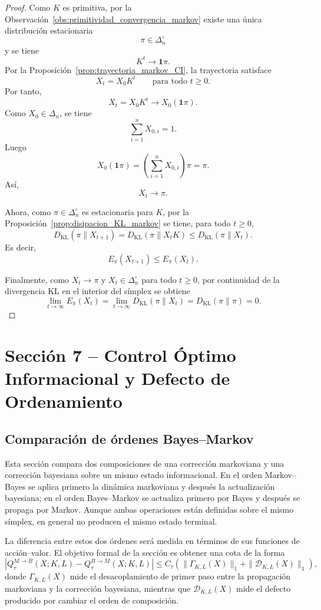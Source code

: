 \documentclass[12pt]{article}
\begin{document}
\begin{proof}
Como \(K\) es primitiva, por la Observación~\ref{obs:primitividad_convergencia_markov} existe una única distribución estacionaria
\[
\pi\in\Delta_n^\circ
\]
y se tiene
\[
K^t\longrightarrow \mathbf 1\pi.
\]
Por la Proposición~\ref{prop:trayectoria_markov_CI}, la trayectoria satisface
\[
X_t=X_0K^t
\qquad
\text{para todo }t\ge 0.
\]
Por tanto,
\[
X_t=X_0K^t\longrightarrow X_0(\mathbf 1\pi).
\]
Como \(X_0\in\Delta_n\), se tiene
\[
\sum_{i=1}^n X_{0,i}=1.
\]
Luego
\[
X_0(\mathbf 1\pi)
=
\left(\sum_{i=1}^n X_{0,i}\right)\pi
=
\pi.
\]
Así,
\[
X_t\longrightarrow \pi.
\]

Ahora, como \(\pi\in\Delta_n^\circ\) es estacionaria para \(K\), por la Proposición~\ref{prop:disipacion_KL_markov} se tiene, para todo \(t\ge 0\),
\[
D_{\mathrm{KL}}(\pi\|X_{t+1})
=
D_{\mathrm{KL}}(\pi\|X_tK)
\le
D_{\mathrm{KL}}(\pi\|X_t).
\]
Es decir,
\[
E_\pi(X_{t+1})\le E_\pi(X_t).
\]

Finalmente, como \(X_t\to\pi\) y \(X_t\in\Delta_n^\circ\) para todo \(t\ge 0\), por continuidad de la divergencia KL en el interior del símplex se obtiene
\[
\lim_{t\to\infty}E_\pi(X_t)
=
\lim_{t\to\infty}D_{\mathrm{KL}}(\pi\|X_t)
=
D_{\mathrm{KL}}(\pi\|\pi)
=
0.
\]
\end{proof}

\clearpage


\section{Sección 7 -- Control Óptimo Informacional y Defecto de Ordenamiento}

\subsection{Comparación de órdenes Bayes--Markov}

Esta sección compara dos composiciones de una corrección markoviana y una corrección bayesiana sobre un mismo estado informacional. En el orden Markov--Bayes se aplica primero la dinámica markoviana y después la actualización bayesiana; en el orden Bayes--Markov se actualiza primero por Bayes y después se propaga por Markov. Aunque ambas operaciones están definidas sobre el mismo símplex, en general no producen el mismo estado terminal.

La diferencia entre estos dos órdenes será medida en términos de sus funciones de acción--valor. El objetivo formal de la sección es obtener una cota de la forma
\[
\left|
Q_\tau^{M\to B}(X;K,L)-Q_\tau^{B\to M}(X;K,L)
\right|
\le
C_\tau\left(
\|\Gamma_{K,L}(X)\|_1+
\|\mathcal D_{K,L}(X)\|_1
\right),
\]
donde \(\Gamma_{K,L}(X)\) mide el desacoplamiento de primer paso entre la propagación markoviana y la corrección bayesiana, mientras que \(\mathcal D_{K,L}(X)\) mide el defecto producido por cambiar el orden de composición.
\end{document}
